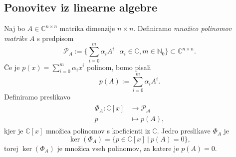 \documentclass[mat1]{fmfdelo}
\newcommand{\N}{\mathbb N}
\newcommand{\C}{\mathbb C}
\begin{document}
\subsection{Ponovitev iz linearne algebre}\label{linearnaAlgebra}
Naj bo $A \in \C^{n \times n}$ matrika dimenzije $n \times n$. Definiramo \emph{množico polinomov matrike} $A$ s predpisom
\begin{equation*}
    \mathcal{P}_A := \Big\{ \sum_{i=0}^m \alpha_i A^i\ |\  \alpha_i \in \C, m \in \N_0 \Big\} \subset \C^{n \times n}.
\end{equation*}
Če je $p(x) = \sum_{i=0}^m \alpha_i x^i$ polinom, bomo pisali
\begin{equation*}
    p(A) := \sum_{i=0}^m \alpha_i A^i.
\end{equation*}
Definiramo preslikavo
\begin{align}
\begin{split}
    \Phi_A : \C [x] &\longrightarrow \mathcal{P_A} \\
    p &\longmapsto p(A),
\end{split}
\end{align}
kjer je $\C [x]$ množica polinomov s koeficienti iz $\C$. Jedro preslikave $\Phi_A$ je
\begin{equation*}
    \ker (\Phi_A) = \Big\{ p \in \C [x] \ | \  p(A) = 0 \Big\},
\end{equation*}
torej $\ker(\Phi_A)$ je množica vseh polinomov, za katere je $p(A) = 0$.
\end{document}
